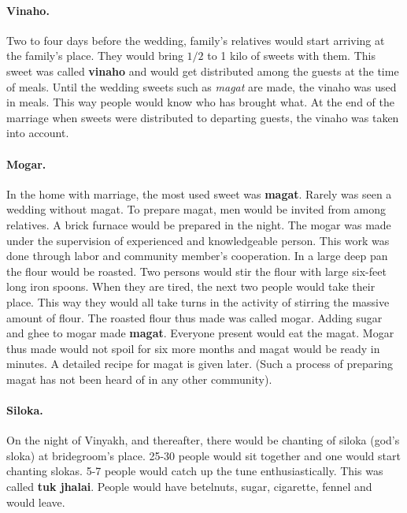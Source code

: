 \paragraph{Vinaho.} Two to four days before the wedding, family's relatives
would start arriving at the family's place. They would bring $1/2$ to 1 kilo of
sweets with them. This sweet was called \textbf{vinaho} and would get
distributed among the guests at the time of meals. Until the wedding sweets
such as \textit{magat} are made, the vinaho was used in meals. This way people
would know who has brought what. At the end of the marriage when sweets were
distributed to departing guests, the vinaho was taken into account.

\paragraph{Mogar.} In the home with marriage, the most used sweet was
\textbf{magat}. Rarely was seen a wedding without magat. To prepare magat, men
would be invited from among relatives. A brick furnace would be prepared in the
night. The mogar was made under the supervision of experienced and knowledgeable
person. This work was done through labor and community member's cooperation. In
a large deep pan the flour would be roasted. Two persons would stir the flour
with large six-feet long iron spoons. When they are tired, the next two people
would take their place. This way they would all take turns in the activity of
stirring the massive amount of flour. The roasted flour thus made was called
mogar. Adding sugar and ghee to mogar made \textbf{magat}. Everyone present
would eat the magat. Mogar thus made would not spoil for six more months and
magat would be ready in minutes. A detailed recipe for magat is given later.
(Such a process of preparing magat has not been heard of in any other
community).

\paragraph{Siloka.} On the night of Vinyakh, and thereafter, there would be
chanting of siloka (god's sloka) at bridegroom's place. 25-30 people would sit
together and one would start chanting slokas. 5-7 people would catch up the
tune enthusiastically. This was called \textbf{tuk jhalai}. People would have
betelnuts, sugar, cigarette, fennel and would leave.

